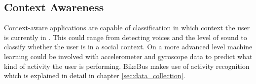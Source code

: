     
\subsection{Context Awareness}
\label{section:Mobile_Sensing_Context_Awareness}


Context-aware applications are capable of classification in which context the user is currently in \cite{context-aware}. This could range from detecting voices and the level of sound to classify whether the user is in a social context. On a more advanced level machine learning could be involved with accelerometer and gyroscope data to predict what kind of activity the user is performing. BikeBus makes use of activity recognition which is explained in detail in chapter \ref{sec:data_collection}.
